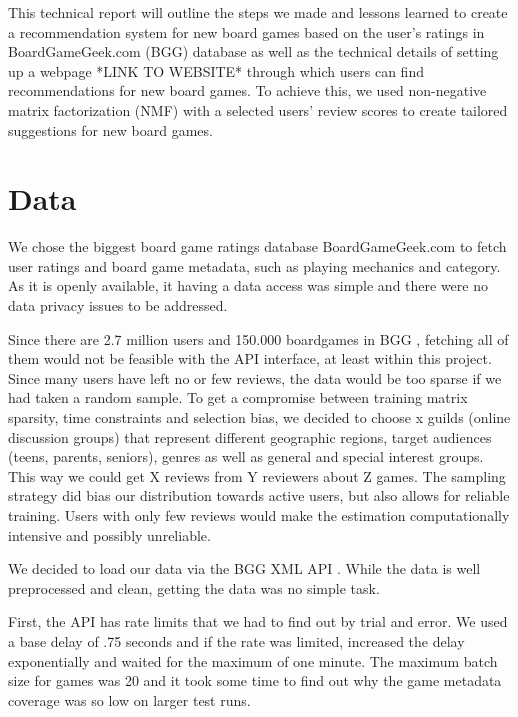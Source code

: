 \documentclass[a4paper,12pt,bibliography=totoc,numbers=noenddot,sfdefaults=false,abstract=true,notitlepage]{scrartcl} %
\begin{document}
	This technical report will outline the steps we made and lessons learned to create a recommendation system for new board games based on the user's ratings in BoardGameGeek.com (BGG) database as well as the technical details of setting up a webpage *LINK TO WEBSITE* through which users can find recommendations for new board games. To achieve this, we used non-negative matrix factorization (NMF) with a selected users' review scores to create tailored suggestions for new board games.
	
	
	
	
	\section{Data}\label{data}

	We chose the biggest board game ratings database BoardGameGeek.com to fetch user ratings and board game metadata, such as playing mechanics and category. As it is openly available, it having a data access was simple and there were no data privacy issues to be addressed.

	Since there are 2.7 million users  and 150.000 boardgames in BGG \autocite{didymus-trueBoardGameGeeksSupportDrive2024,wordsratedBoardGamesStatistics2025}, fetching all of them would not be feasible with the API interface, at least within this project. Since many users have left no or few reviews, the data would be too sparse if we had taken a random sample. To get a compromise between training matrix sparsity, time constraints and selection bias, we decided to choose x guilds (online discussion groups) that represent different geographic regions, target audiences (teens, parents, seniors), genres as well as general and special interest groups. This way we could get X reviews from Y reviewers about Z games. The sampling strategy did bias our distribution towards active users, but also allows for reliable training. Users with only few reviews would make the estimation computationally intensive and possibly unreliable.
	
	We decided to load our data via the BGG XML API \autocite{bbgBGGXMLAPI22025}. While the data is well preprocessed and clean, getting the data was no simple task.

	First, the API has rate limits that we had to find out by trial and error. We used a base delay of .75 seconds and if the rate was limited, increased the delay exponentially and waited for the maximum of one minute. The maximum batch size for games was 20 and it took some time to find out why the game metadata coverage was so low on larger test runs.
\end{document}
